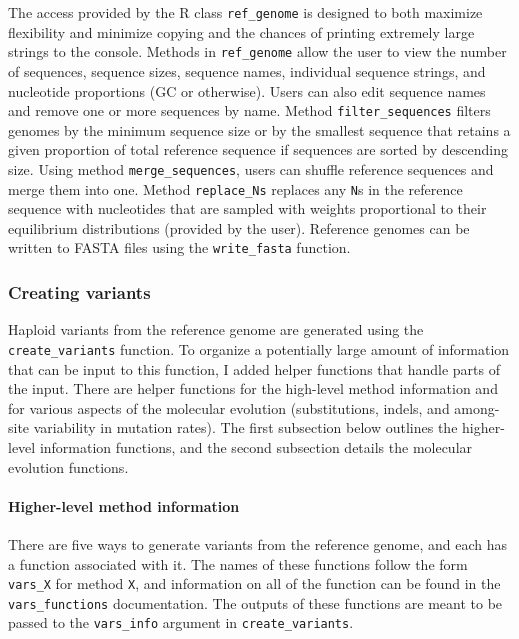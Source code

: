 \documentclass[12pt,]{article}
\let\oldparagraph\paragraph
\renewcommand{\paragraph}[1]{\oldparagraph{#1}\mbox{}}
\begin{document}
The access provided by the R class \texttt{ref\_genome} is designed to both
maximize flexibility and minimize copying and the chances of
printing extremely large strings to the console.
Methods in \texttt{ref\_genome} allow the user to view the
number of sequences, sequence sizes, sequence names, individual sequence strings,
and nucleotide proportions (GC or otherwise).
Users can also edit sequence names and remove one or more sequences by name.
Method \texttt{filter\_sequences} filters genomes by the minimum sequence size or
by the smallest sequence that retains a given proportion of total reference
sequence if sequences are sorted by descending size.
Using method \texttt{merge\_sequences}, users can shuffle reference sequences and
merge them into one.
Method \texttt{replace\_Ns} replaces any \texttt{N}s in the reference sequence with nucleotides
that are sampled with weights proportional to their equilibrium distributions
(provided by the user).
Reference genomes can be written to FASTA files using the \texttt{write\_fasta} function.

\hypertarget{creating-variants}{%
\subsubsection{Creating variants}\label{creating-variants}}

Haploid variants from the reference genome are generated using the
\texttt{create\_variants} function.
To organize a potentially large amount of information that can be input to this function,
I added helper functions that handle parts of the input.
There are helper functions for the high-level method information and
for various aspects of the molecular evolution (substitutions, indels, and among-site
variability in mutation rates).
The first subsection below outlines the higher-level information functions, and
the second subsection details the molecular evolution functions.

\hypertarget{higher-level-method-information}{%
\paragraph{Higher-level method information}\label{higher-level-method-information}}

There are five ways to generate variants from the reference genome, and
each has a function associated with it.
The names of these functions follow the form \texttt{vars\_X} for method \texttt{X},
and information on all of the function can be found in the \texttt{vars\_functions} documentation.
The outputs of these functions are meant to be passed to the \texttt{vars\_info} argument
in \texttt{create\_variants}.
\end{document}
